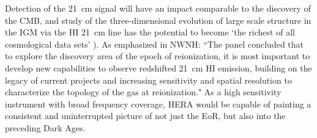 \documentclass[preprint]{aastex}
\def\HI{{H{\small I }}}
\begin{document}
Detection of the 21~cm signal will have an impact
comparable to the discovery of the CMB, and study of the three-dimensional
evolution of large scale structure in the IGM via the \HI 21~cm line has the
potential to become `the richest of all cosmological data sets'
\citep{barkana_loeb2005a,loeb_zaldarriaga2004}).  As emphasized in
NWNH: ``The panel concluded that to explore the discovery
area of the epoch of reionization, it is most important to develop new
capabilities to observe redshifted 21~cm \HI emission, building on the legacy of
current projects and increasing sensitivity and spatial resolution to
characterize the topology of the gas at reionization."  
As a high
sensitivity instrument with broad frequency coverage, HERA would be capable of
painting a consistent and uninterrupted picture of not just the EoR, but also
into the preceding Dark Ages.  

\end{document}

